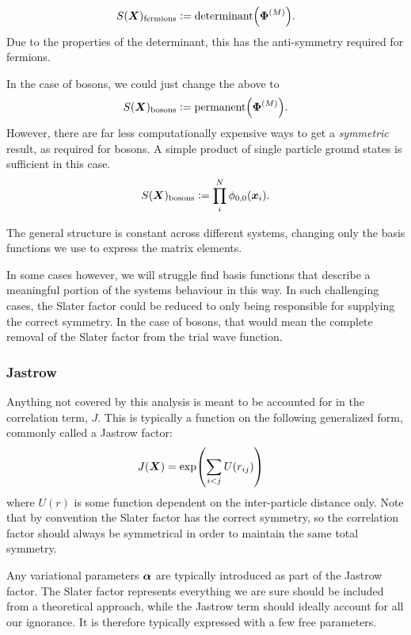 \documentclass[Thesis.tex]{subfiles}
\begin{document}
\begin{align}
    S(\bm{X})_\text{fermions} \vcentcolon= \text{determinant}\qty(\bm{\Phi}^{(M)}).
\end{align}
Due to the properties of the determinant, this has the anti-symmetry required for
fermions.

In the case of bosons, we could just change the above to
\begin{align}
    S(\bm{X})_\text{bosons} \vcentcolon= \text{permanent}\qty(\bm{\Phi}^{(M)}).
\end{align}
However, there are far less computationally expensive ways to get a \emph{symmetric}
result, as required for bosons. A simple product of single particle ground states is
sufficient in this case.
\begin{align}
    S(\bm{X})_\text{bosons} \vcentcolon= \prod_{i}^N \phi_{0,0}(\bm{x}_i).
\end{align}

The general structure is constant across different systems, changing only the basis
functions we use to express the matrix elements. 

In some cases however, we will struggle find basis functions that describe a meaningful
portion of the systems behaviour in this way. In such challenging cases, the Slater factor
could be reduced to only being responsible for supplying the correct symmetry. In the case
of bosons, that would mean the complete removal of the Slater factor from the trial wave
function.



\subsubsection*{Jastrow}

Anything not covered by this analysis is meant to be accounted for in the correlation
term, $J$. This is typically a function on the following generalized form, commonly called a Jastrow
factor:
\begin{align}
    J(\bm{X}) &= \exp(\sum_{i < j} U(r_{ij}))
\end{align}
where $U(r)$ is some function dependent on the inter-particle distance only. Note that by
convention the Slater factor has the correct symmetry, so the correlation factor should
always be symmetrical in order to maintain the same total symmetry.

Any variational parameters $\bm{\alpha}$ are typically introduced as part of the Jastrow
factor. The Slater factor represents everything we are sure should be included
from a theoretical approach, while the Jastrow term should ideally account for all our ignorance.
It is therefore typically expressed with a few free parameters.
\end{document}

